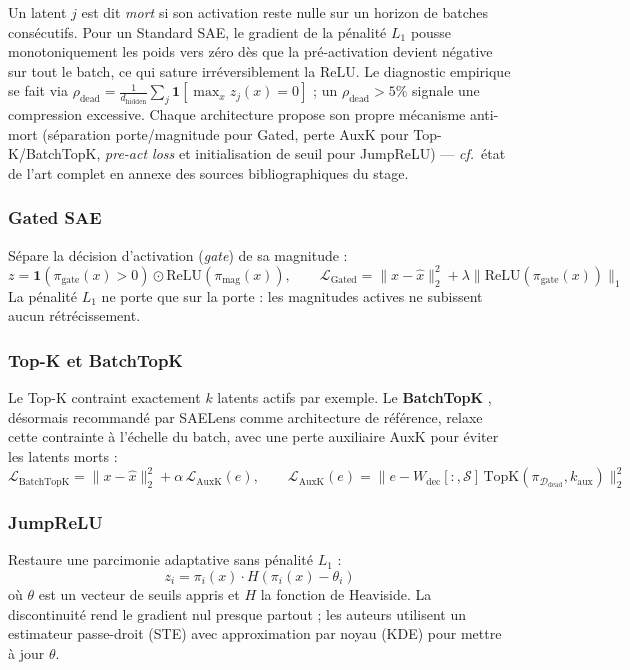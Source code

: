 \documentclass[11pt]{article}
\newcommand{\ind}{\mathbf{1}}
\begin{document}
Un latent $j$ est dit \emph{mort} si son activation reste nulle sur un
horizon de batches consécutifs. Pour un Standard SAE, le gradient de la
pénalité $L_1$ pousse monotoniquement les poids vers zéro dès que la
pré-activation devient négative sur tout le batch, ce qui sature
irréversiblement la ReLU. Le diagnostic empirique se fait via
$\rho_\text{dead} = \frac{1}{d_\text{hidden}} \sum_j \ind[\max_x z_j(x) = 0]$ ;
un $\rho_\text{dead} > 5\%$ signale une compression excessive. Chaque
architecture propose son propre mécanisme anti-mort (séparation porte/magnitude
pour Gated, perte AuxK pour Top-K/BatchTopK, \emph{pre-act loss} et
initialisation de seuil pour JumpReLU) --- \emph{cf.}~état de l'art complet en
annexe des sources bibliographiques du stage.

\subsubsection{Gated SAE}
Sépare la décision d'activation (\emph{gate}) de sa magnitude
\cite{rajamanoharan2024gated} :
\[
  z = \ind(\pi_\text{gate}(x) > 0) \odot \text{ReLU}(\pi_\text{mag}(x)), \qquad
  \mathcal{L}_\text{Gated} = \|x - \hat{x}\|_2^2 + \lambda \|\text{ReLU}(\pi_\text{gate}(x))\|_1
\]
La pénalité $L_1$ ne porte que sur la porte : les magnitudes actives ne
subissent aucun rétrécissement.

\subsubsection{Top-K et BatchTopK}
Le Top-K contraint exactement $k$ latents actifs par exemple. Le
\textbf{BatchTopK} \cite{gao2024topk, bussmann2025batchtopk}, désormais
recommandé par SAELens comme architecture de référence, relaxe cette
contrainte à l'échelle du batch, avec une perte auxiliaire AuxK pour éviter
les latents morts :
\[
  \mathcal{L}_\text{BatchTopK} = \|x - \hat{x}\|_2^2 + \alpha\,\mathcal{L}_\text{AuxK}(e), \qquad
  \mathcal{L}_\text{AuxK}(e) = \bigl\|e - W_\text{dec}[:,\mathcal{S}]\,\text{TopK}(\pi_{\mathcal{D}_\text{dead}}, k_\text{aux})\bigr\|_2^2
\]

\subsubsection{JumpReLU}
Restaure une parcimonie adaptative sans pénalité $L_1$
\cite{rajamanoharan2024jumprelu} :
\[
  z_i = \pi_i(x) \cdot H(\pi_i(x) - \theta_i)
\]
où $\theta$ est un vecteur de seuils appris et $H$ la fonction de Heaviside.
La discontinuité rend le gradient nul presque partout ; les auteurs
utilisent un estimateur passe-droit (STE) avec approximation par noyau (KDE)
pour mettre à jour $\theta$.
\end{document}
